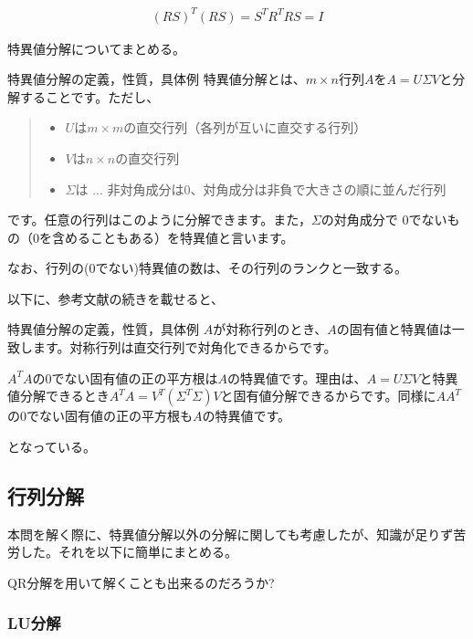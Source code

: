 \documentclass[a4paper, 10pt, dvipdfmx]{jlreq}
\begin{document}
\begin{align*}
  (RS)^T(RS)=S^TR^TRS=I
\end{align*}

特異値分解についてまとめる。

\begin{itembox}[l]{特異値分解の定義，性質，具体例\cite{site:3}}
  特異値分解とは、$m\times n$行列$A$を$A=U \Sigma V$と分解することです。ただし、

  \begin{quote}
    \begin{itemize}
      \item $U$は$m \times m$の直交行列（各列が互いに直交する行列）
      \item $V$は$n \times n$の直交行列
      \item $\Sigma$は ... 非対角成分は0、対角成分は非負で大きさの順に並んだ行列
    \end{itemize}
  \end{quote}

  です。任意の行列はこのように分解できます。また，$Σ$の対角成分で 0でないもの（0を含めることもある）を特異値と言います。
\end{itembox}

なお、行列の(0でない)特異値の数は、その行列のランクと一致する。

以下に、参考文献の続きを載せると、

\begin{itembox}[l]{特異値分解の定義，性質，具体例\cite{site:3}}
  $A$が対称行列のとき、$A$の固有値と特異値は一致します。対称行列は直交行列で対角化できるからです。

  $A^TA$の0でない固有値の正の平方根は$A$の特異値です。理由は、$A=U\Sigma V$と特異値分解できるとき$A^TA=V^T(\Sigma^T\Sigma)V$と固有値分解できるからです。同様に$AA^T$の0でない固有値の正の平方根も$A$の特異値です。
\end{itembox}

となっている。

\subsection*{行列分解}

本問を解く際に、特異値分解以外の分解に関しても考慮したが、知識が足りず苦労した。それを以下に簡単にまとめる。

QR分解を用いて解くことも出来るのだろうか?

\subsubsection*{LU分解}
\end{document}
